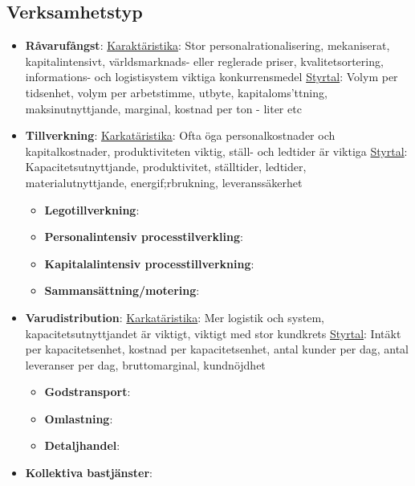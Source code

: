 \subsection{Verksamhetstyp}
\begin{itemize}
    \item \textbf{Råvarufångst}: \newline
    \underline{Karaktäristika}:
    Stor personalrationalisering, mekaniserat, kapitalintensivt, världsmarknads- eller reglerade priser, kvalitetsortering, informations- och logistisystem viktiga konkurrensmedel \newline
    \underline{Styrtal}:
    Volym per tidsenhet, volym per arbetstimme, utbyte, kapitaloms'ttning, maksinutnyttjande, marginal, kostnad per ton - liter etc
    \item \textbf{Tillverkning}: \newline
    \underline{Karkatäristika}:
    Ofta öga personalkostnader och kapitalkostnader, produktiviteten viktig, ställ- och ledtider är viktiga \newline
    \underline{Styrtal}:
    Kapacitetsutnyttjande, produktivitet, ställtider, ledtider, materialutnyttjande, energif;rbrukning, leveranssäkerhet
    \begin{itemize}
        \item \textbf{Legotillverkning}:
        \item \textbf{Personalintensiv processtilverkling}:
        \item \textbf{Kapitalalintensiv processtillverkning}:
        \item \textbf{Sammansättning/motering}:
    \end{itemize}
    \item \textbf{Varudistribution}: \newline
    \underline{Karkatäristika}:
    Mer logistik och system, kapacitetsutnyttjandet är viktigt, viktigt med stor kundkrets \newline
    \underline{Styrtal}:
    Intäkt per kapacitetsenhet, kostnad per kapacitetsenhet, antal kunder per dag, antal leveranser per dag, bruttomarginal, kundnöjdhet
    \begin{itemize}
        \item \textbf{Godstransport}:
        \item \textbf{Omlastning}:
        \item \textbf{Detaljhandel}:
    \end{itemize}
    \item \textbf{Kollektiva bastjänster}: \newline

\end{itemize}
